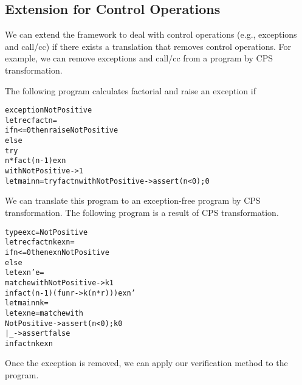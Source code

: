\subsection{Extension for Control Operations}
\label{sec:control}
We can extend the framework to deal with control operations (e.g., exceptions and call/cc) if there
exists a translation that removes control operations.  For example,
we can remove exceptions and call/cc from a program by CPS transformation.

\begin{example}
The following program calculates factorial and raise an exception if
\begin{alltt}
exception NotPositive
let rec fact n =
  if n <= 0 then raise NotPositive
  else
    try
      n * fact (n - 1) exn
    with NotPositive -> 1
let main n = try fact n with NotPositive -> assert (n < 0); 0
\end{alltt}
We can translate this program to an exception-free program by CPS transformation.
The following program is a result of CPS transformation.
\begin{alltt}
type exc = NotPositive
let rec fact n k exn =
  if n <= 0 then exn NotPositive
  else
    let exn' e =
      match e with NotPositive -> k 1
    in fact (n - 1) (fun r -> k (n * r))) exn'
let main n k =
  let exn e = match e with
                  NotPositive -> assert (n < 0); k 0
                | _ -> assert false
  in fact n k exn
\end{alltt}
Once the exception is removed, we can apply our verification method to the
program.
\end{example}

